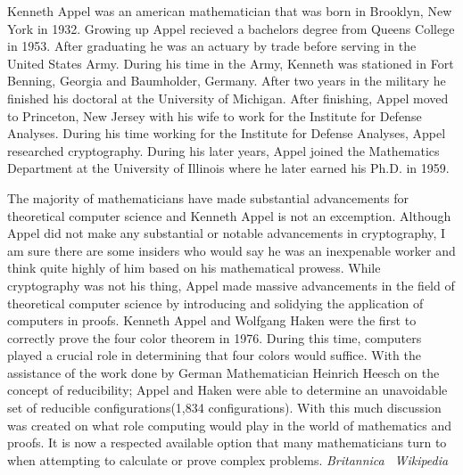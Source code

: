 \documentclass{article}
\begin{document}
Kenneth Appel was an american mathematician that was born in Brooklyn, New York in 1932. Growing up Appel recieved a 
bachelors degree from Queens College in 1953. After graduating he was an 
actuary by trade before serving in the United States Army. During his time in the Army, Kenneth was stationed in 
Fort Benning, Georgia and Baumholder, Germany. After two years in the military he finished his doctoral at 
the University of Michigan. After finishing, Appel moved to Princeton, New Jersey with his wife to work for 
the Institute for Defense Analyses. During his time working for the Institute for Defense Analyses, Appel 
researched cryptography. During his later years, Appel joined the Mathematics Department at the University 
of Illinois where he later earned his Ph.D. in 1959. 

The majority of mathematicians have made substantial advancements for theoretical computer science and 
Kenneth Appel is not an excemption. Although Appel did not make any substantial or notable advancements 
in cryptography, I am sure there are some insiders who would say he was an inexpenable worker and think quite 
highly of him based on his mathematical prowess. While cryptography was not his thing, Appel made massive 
advancements in the field of theoretical computer science by introducing and solidying the application of 
computers in proofs. Kenneth Appel and Wolfgang Haken were the first to correctly prove the
four color theorem in 1976. During this time, computers played a crucial role in determining that
four colors would suffice. With the assistance of the work done by German Mathematician
Heinrich Heesch on the concept of reducibility; Appel and Haken were able to determine
an unavoidable set of reducible configurations(1,834 configurations). With this much discussion 
was created on what role computing would play in the world of mathematics and proofs. It is now a respected 
available option that many mathematicians turn to when attempting to calculate or prove complex problems. 
\emph{Britannica}~\cite{britannica}
\emph{Wikipedia}~\cite{wikipedia}


 \newpage
 
 
\end{document}
